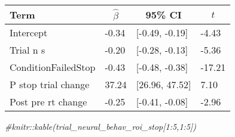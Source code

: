 \documentclass[
  english,
  ,man]{apa6}
\newenvironment{Shaded}{\begin{snugshade}}{\end{snugshade}}
\newcommand{\CommentTok}[1]{\textcolor[rgb]{0.56,0.35,0.01}{\textit{#1}}}
\begin{document}
\begin{table}[tbp]

\begin{center}
\begin{threeparttable}

\caption{\label{tab:unnamed-chunk-4}}

\begin{tabular}{llll}
\toprule
Term & \multicolumn{1}{c}{$\hat{\beta}$} & \multicolumn{1}{c}{95\% CI} & \multicolumn{1}{c}{$t$}\\
\midrule
Intercept & -0.34 & {}[-0.49, -0.19] & -4.43\\
Trial n s & -0.20 & {}[-0.28, -0.13] & -5.36\\
ConditionFailedStop & -0.43 & {}[-0.48, -0.38] & -17.21\\
P stop trial change & 37.24 & {}[26.96, 47.52] & 7.10\\
Post pre rt change & -0.25 & {}[-0.41, -0.08] & -2.96\\
\bottomrule
\end{tabular}

\end{threeparttable}
\end{center}

\end{table}

\begin{Shaded}
\begin{Highlighting}[]
\CommentTok{#knitr::kable(trial_neural_behav_roi_stop[1:5,1:5])}
\end{Highlighting}
\end{Shaded}
\end{document}
